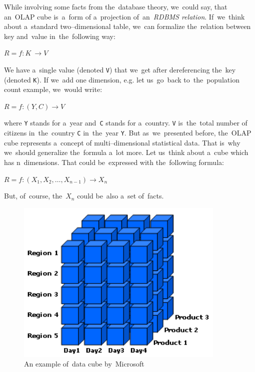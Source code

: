While involving some facts from the~database theory, we~could say, that an~OLAP cube is~a~form
of a~projection of~an~\emph{RDBMS relation}. If~we~think about a~standard two--dimensional table, we~can
formalize the~relation between key and~value in~the~following way:

\begin{center}
$R = f: K~\rightarrow V$
\end{center}

We have a~single value (denoted \texttt{V}) that we~get after dereferencing the~key (denoted \texttt{K}).
If we~add one dimension, e.g. let us~go~back to~the~population count example, we~would write:

\begin{center}
$R = f: (Y,C) \rightarrow V$
\end{center}

where \texttt{Y} stands for a~year and~\texttt{C} stands for a~country. \texttt{V} is~the~total number of
citizens in~the~country \texttt{C} in~the~year \texttt{Y}.
But as~we~presented before, the~OLAP cube represents a~concept of
multi--dimensional statistical data. That is~why we~should generalize the~formula a~lot more.
Let us~think about a~cube which has n~dimensions. That could be~expressed with the~following
formula:

\begin{center}
$R = f: (X_{1}, X_{2}, …, X_{n-1}) \rightarrow X_{n}$
\end{center}

But, of~course, the~$X_{n}$ could be~also a~set of~facts.


\begin{figure}
	\centering
	\includegraphics[width=100mm]{img/data-cube.png}
	\caption{An example of~data cube by~Microsoft~\cite{msdn-cube}}
	\label{fig:lod-cloud}
\end{figure}

